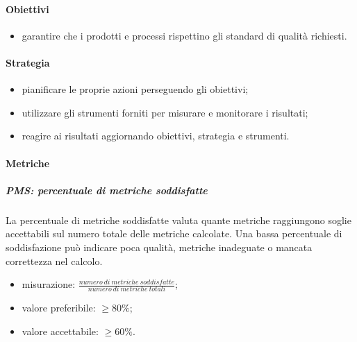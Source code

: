 		\paragraph{Obiettivi}
			\begin{itemize}
				\item garantire che i prodotti e processi rispettino gli standard di qualità richiesti.
			\end{itemize}
		\paragraph{Strategia}
		\begin{itemize}
			\item pianificare le proprie azioni perseguendo gli obiettivi;
			\item utilizzare gli strumenti forniti per misurare e monitorare i risultati;
			\item reagire ai risultati aggiornando obiettivi, strategia e strumenti.
		\end{itemize}
		\paragraph{Metriche}
			\subparagraph{PMS: percentuale di metriche soddisfatte}
			La percentuale di metriche soddisfatte valuta quante metriche raggiungono soglie accettabili sul numero totale delle metriche calcolate. Una bassa percentuale di soddisfazione può indicare poca qualità, metriche inadeguate o mancata correttezza nel calcolo.
			\begin{itemize}
				\item misurazione: $\frac{numero\ di\ metriche\ soddisfatte}{numero\ di\ metriche\ totali} $;
				\item valore preferibile: $ \geq 80\%$;
				\item valore accettabile: $ \geq 60\%$.
			\end{itemize}
		